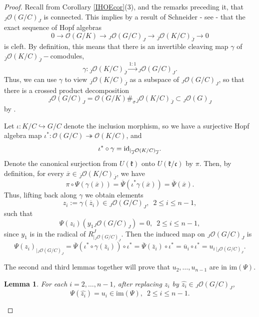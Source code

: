 \documentclass{amsart}
\numberwithin{equation}{section}
\newtheorem{lemma}[theorem]{Lemma}
\theoremstyle{definition}
\begin{document}
\begin{proof}
Recall from Corollary \ref{IHOEcor}(3), and the remarks preceding it, that ${}_J\mathcal{O}(G/C)_J$ is connected. This implies by a result of Schneider \cite{Sch} - see \cite[Theorem 8.4.8 and Example (2) in remarks following]{M} - that the exact sequence of Hopf algebras 
$$ 0 \rightarrow \mathcal{O}(G/K)  \rightarrow {}_J\mathcal{O}(G/C)_J  \rightarrow {}_{\overline{J}}\mathcal{O}(K/C)_{\overline{J}} \rightarrow 0 $$
is cleft. By definition, this means that there is an invertible cleaving map $\gamma$ of ${}_{\overline{J}}\mathcal{O}(K/C)_{\overline{J}}-$comodules, 
$$\gamma:{}_{\overline{J}}\mathcal{O}(K/C)_{\overline{J}}\xrightarrow{1:1}{}_J\mathcal{O}(G/C)_{J}.$$
Thus, we can use $\gamma$ to view ${}_{\overline{J}}\mathcal{O}(K/C)_{\overline{J}}$ as a subspace of ${}_J\mathcal{O}(G/C)_{J}$, so that there is a crossed product decomposition
$${}_J\mathcal{O}(G/C)_{J}=\mathcal{O}(G/K)\#_{\sigma}{}_{\overline{J}}\mathcal{O}(K/C)_{\overline{J}}\subset {}_J\mathcal{O}(G)_J $$ 
by \cite[Theorem 7.2.2]{M}.

Let $\iota:K/C\hookrightarrow G/C$ denote the inclusion morphism, so we have a surjective Hopf algebra map $\iota^* : \mathcal{O}(G/C) \twoheadrightarrow \mathcal{O}(K/C)$, and
$$\iota^*\circ \gamma={\rm id}_{|{}_{\overline{J}}\mathcal{O}(K/C)_{\overline{J}}}.$$
Denote the canonical surjection from $U(\mathfrak{k})$ onto $U(\mathfrak{k}/\mathfrak{c})$ by $\pi$. Then, by definition, for every $\overline{x}\in {}_{\overline{J}}\mathcal{O}(K/C)_{\overline{J}}$, we have 
$$ \pi \circ \Psi(\gamma(\overline{x}))=\overline{\Psi}(\iota^*\gamma(\overline{x}))=\overline{\Psi}(\overline{x}).$$
Thus, lifting back along $\gamma$ we obtain elements 
$$z_i := \gamma (\overline{z}_i)\in {}_J\mathcal{O}(G/C)_J,\,\,\,2\le i \le n-1,$$ such that 
$$ \Psi(z_i)\left(y_1{}_J\mathcal{O}(G/C)_J\right)=0,\,\,\,2\le i \le n-1,$$
since $y_1$ is in the radical of $R^J_{|{}_J\mathcal{O}(G/C)_J}$. Then the induced map on ${}_J\mathcal{O}(G/C)_J$ is
\begin{equation}\label{capture} 
\Psi(z_i)_{|{}_J\mathcal{O}(G/C)_J}=\overline{\Psi}(\iota^*\circ \gamma (\overline{z}_i)) \circ \iota^* = \overline{\Psi}(\overline{z}_i)\circ \iota^* =  \overline{u}_{i}\circ \iota^*  = u_{i\, |{}_J\mathcal{O}(G/C)_J}.
\end{equation}

The second and third lemmas together will prove that $u_2, \ldots, u_{n-1}$ are in $\mathrm{im}(\Psi)$.

\begin{lemma}\label{ClaimII} 
For each $i = 2, \ldots , n-1$, after replacing $z_i$ by $\widehat{z_i} \in {}_J\mathcal{O}(G/C)_J$, 
$$\Psi(\widehat{z_i})=u_i\in \mathrm{im}(\Psi),\,\,\,2 \leq i \leq n-1.$$
\end{lemma}


\end{proof}
\end{document}
